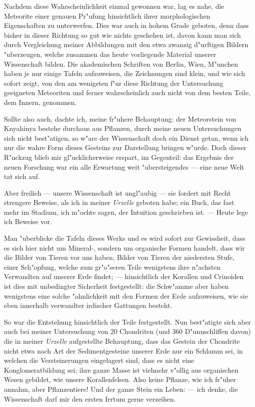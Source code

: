 \documentclass[a4paper, 11pt, oneside]{article}
\begin{document}
Nachdem diese Wahrscheinlichkeit einmal gewonnen war, lag es nahe, die Meteorite einer genauen Pr"ufung hinsichtlich ihrer morphologischen Eigenschaften zu unterwerfen. Dies war auch in hohem Grade geboten, denn dass bisher in dieser Richtung so gut wie nichts geschehen ist, davon kann man sich durch Vergleichung meiner Abbildungen mit den etwa zwanzig d"urftigen Bildern "uberzeugen, welche zusammen das heute vorliegende Material unserer Wissenschaft bilden. Die akademischen Schriften von Berlin, Wien, M"unchen haben je nur einige Tafeln aufzuweisen, die Zeichnungen sind klein, und wie sich sofort zeigt, von den am wenigsten f"ur diese Richtung der Untersuchung geeigneten Meteoriten und ferner wahrscheinlich auch nicht von dem besten Teile, dem Innern, genommen.

Sollte also auch, dachte ich, meine fr"uhere Behauptung: der Meteorstein von Knyahinya bestehe durchaus aus Pflanzen, durch meine neuen Untersuchungen sich nicht best"atigen, so w"are der Wissenschaft doch ein Dienst getan, wenn ich nur die wahre Form dieses Gesteins zur Darstellung bringen w"urde. Doch dieser R"uckzug blieb mir gl"ucklicherweise erspart, im Gegenteil: das Ergebnis der neuen Forschung war ein alle Erwartung weit "ubersteigendes --- eine neue Welt tat sich auf.

Aber freilich --- unsere Wissenschaft ist ungl"aubig --- sie fordert mit Recht strengere Beweise, als ich in meiner \emph{Urzelle} geboten habe; ein Buch, das fast mehr im Stadium, ich m"ochte sagen, der Intuition geschrieben ist. --- Heute lege ich Beweise vor.

Man "uberblicke die Tafeln dieses Werks und es wird sofort zur Gewissheit, dass es sich hier nicht um Mineral-, sondern um organische Formen handelt, dass wir die Bilder von Tieren vor uns haben, Bilder von Tieren der niedersten Stufe, einer Sch"opfung, welche zum gr"o"seren Teile wenigstens ihre n"achsten Verwandten auf unserer Erde findet; --- hinsichtlich der Korallen und Crinoiden ist dies mit unbedingter Sicherheit festgestellt: die Schw"amme aber haben wenigstens eine solche "ahnlichkeit mit den Formen der Erde aufzuweisen, wie sie eben innerhalb verwandter irdischer Gattungen besteht.

So war die Entstehung hinsichtlich der Teile festgestellt. Nun best"atigte sich aber auch bei meiner Untersuchung von 20 Chondriten (und 360 D"unnschliffen davon) die in meiner \emph{Urzelle} aufgestellte Behauptung, dass das Gestein der Chondrite nicht etwa nach Art der Sedimentgesteine unserer Erde nur ein Schlamm sei, in welchen die Versteinerungen eingelagert sind, dass es nicht eine Konglomeratbildung sei; ihre ganze Masse ist vielmehr v"ollig aus organischen Wesen gebildet, wie unsere Korallenfelsen. Also keine Pflanze, wie ich fr"uher annahm, aber Pflanzentiere! Und der ganze Stein ein Leben: --- ich denke, die Wissenschaft darf mir den ersten Irrtum gerne verzeihen.
\end{document}
